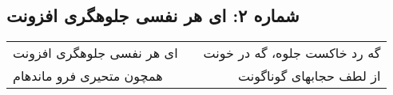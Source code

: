 \begin{center}
\section*{شماره ۲: ای هر نفسی جلوهگری افزونت}
\label{sec:002}
\begin{longtable}{l p{0.5cm} r}
ای هر نفسی جلوهگری افزونت
&&
گه رد خاکست جلوه، گه در خونت
\\
همچون متحیری فرو ماندهام
&&
از لطف حجابهای گوناگونت
\\
\end{longtable}
\end{center}
